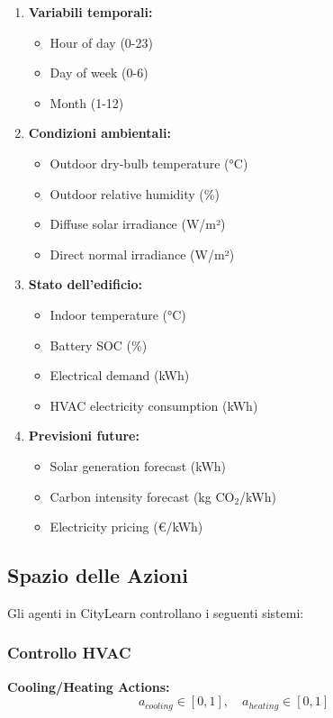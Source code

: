 \documentclass[12pt,a4paper,twoside]{report}
\begin{document}
\begin{enumerate}
    \item \textbf{Variabili temporali:}
    \begin{itemize}
        \item Hour of day (0-23)
        \item Day of week (0-6)
        \item Month (1-12)
    \end{itemize}

    \item \textbf{Condizioni ambientali:}
    \begin{itemize}
        \item Outdoor dry-bulb temperature (°C)
        \item Outdoor relative humidity (\%)
        \item Diffuse solar irradiance (W/m²)
        \item Direct normal irradiance (W/m²)
    \end{itemize}

    \item \textbf{Stato dell'edificio:}
    \begin{itemize}
        \item Indoor temperature (°C)
        \item Battery SOC (\%)
        \item Electrical demand (kWh)
        \item HVAC electricity consumption (kWh)
    \end{itemize}

    \item \textbf{Previsioni future:}
    \begin{itemize}
        \item Solar generation forecast (kWh)
        \item Carbon intensity forecast (kg CO$_2$/kWh)
        \item Electricity pricing (€/kWh)
    \end{itemize}
\end{enumerate}

\subsection{Spazio delle Azioni}

Gli agenti in CityLearn controllano i seguenti sistemi:

\subsubsection{Controllo HVAC}
\textbf{Cooling/Heating Actions:}
$$a_{cooling} \in [0, 1], \quad a_{heating} \in [0, 1]$$
\end{document}
